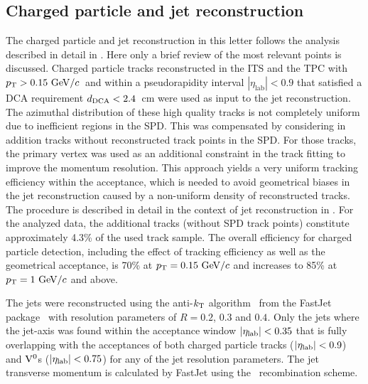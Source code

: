 
\subsection{Charged particle and jet reconstruction}

The charged particle and jet reconstruction in this letter follows the analysis described in detail in \cite{Adam:2015hoa}. Here only a brief review of the most relevant points is discussed.
Charged particle tracks reconstructed in the ITS and the TPC with $p_{\mathrm{T}} > 0.15~\mathrm{GeV}/c$~and within a pseudorapidity interval $|\eta_\mathrm{lab}|<0.9$ that satisfied a DCA requirement
$d_{\rm DCA} < 2.4$~cm were used as input to the jet reconstruction. 
The azimuthal distribution of these high quality tracks is not completely uniform due to inefficient regions in the SPD. This was compensated by considering in addition tracks without reconstructed track points in the SPD. 
For those tracks, the primary vertex was used as an additional constraint in the track fitting to improve the momentum resolution. 
This approach yields a very uniform tracking efficiency within the acceptance, which is needed to avoid geometrical biases in the jet reconstruction caused by a non-uniform density of reconstructed tracks. 
The procedure is described in detail in the context of jet reconstruction in \cite{Adam:2015hoa}. 
For the analyzed data, the additional tracks (without SPD track points) constitute approximately 4.3\% of the used track sample. The overall efficiency for charged particle detection, including the effect of tracking efficiency as well as the geometrical acceptance, is 70\% at $p_{\mathrm{T}} = 0.15 \mbox{~GeV}/c$ and increases to 85\% at $p_{\mathrm{T}} = 1 \mbox{~GeV}/c$ and above. 

The jets were reconstructed using the anti-$k_{\rm T}$ algorithm~\cite{Cacciari:2008gp} from the FastJet package~\cite{Cacciari:2011ma,Cacciari:2005hq} with resolution parameters of $R=0.2$, $0.3$ and $0.4$. 
Only the jets where the jet-axis was found within the acceptance window $\left|\eta_{\rm lab}\right|<0.35$ that is fully overlapping with the acceptances of both charged particle tracks ($\left|\eta_{\rm lab}\right|<0.9$) and ${\rm V}^{0}$s ($\left|\eta_{\rm lab}\right|<0.75$) for any of the jet resolution parameters.
The jet transverse momentum is calculated by FastJet using the \pt\ recombination scheme. 

